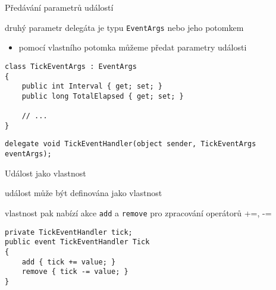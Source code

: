 \begin{frame}[fragile]
\vfill
\begin{bitemize}{Předávání parametrů událostí}
\item druhý parametr delegáta je typu \lstinline|EventArgs| nebo jeho potomkem
\begin{itemize}
\item pomocí vlastního potomka můžeme předat parametry události
\end{itemize}

\end{bitemize}
\vfill
\begin{yesblock}
\begin{lstlisting}
class TickEventArgs : EventArgs 
{
    public int Interval { get; set; }
    public long TotalElapsed { get; set; }
    
    // ...
}
\end{lstlisting}
\end{yesblock}
\vfill
\begin{yesblock}
\begin{lstlisting}
delegate void TickEventHandler(object sender, TickEventArgs eventArgs);
\end{lstlisting}
\end{yesblock}
\vfill
\end{frame}



\begin{frame}[fragile]
\vfill
\begin{bitemize}{Událost jako vlastnost}
\item událost může být definována jako vlastnost
\item vlastnost pak nabízí akce \lstinline[morekeywords={add,remove,value}]|add| a \lstinline[morekeywords={add,remove,value}]|remove| pro zpracování operátorů +=, -=
\end{bitemize}
\vfill
\begin{yesblock}
\begin{lstlisting}[morekeywords={add,remove,value}]
private TickEventHandler tick;
public event TickEventHandler Tick
{
    add { tick += value; }
    remove { tick -= value; }
}
\end{lstlisting}
\end{yesblock}
\vfill
\end{frame}
